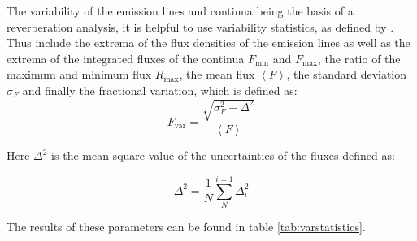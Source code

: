 The variability of the emission lines and continua being the basis of a reverberation analysis, it is helpful to use variability statistics, as defined by \cite{rodriguez1997steps}. Thus include the extrema of the flux densities of the emission lines as well as the extrema of the integrated fluxes of the continua $F_\mathrm{min}$ and $F_\mathrm{max}$, the ratio of the maximum and minimum flux $R_\mathrm{max}$, the mean flux $\left<F\right>$, the standard deviation $\sigma_F$ and finally the fractional variation, which is defined as: 
\begin{equation}
	F_\mathrm{var}=\frac{\sqrt{\sigma_F^2-\Delta^2}}{\left<F\right>}
\end{equation}

Here $\Delta^2$ is the mean square value of the uncertainties of the fluxes defined as:

\begin{equation}
	\Delta^2 = \frac{1}{N} \sum_{N}^{i=1}\Delta_i^2
\end{equation}

The results of these parameters can be found in table \ref{tab:varstatistics}. 






